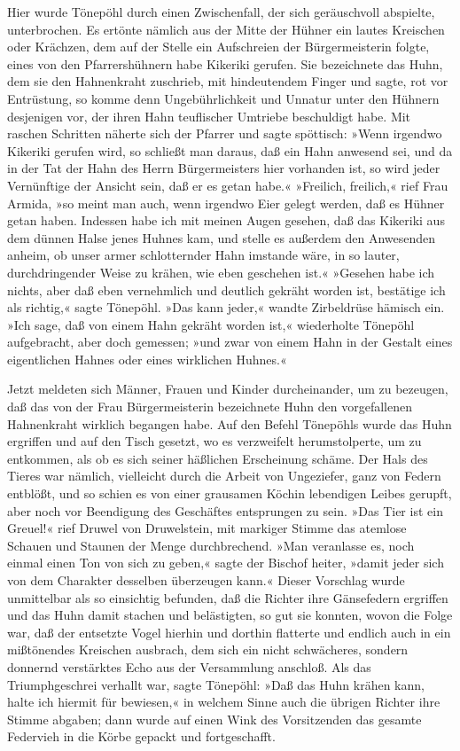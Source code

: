 Hier wurde Tönepöhl durch einen Zwischenfall, der sich geräuschvoll
abspielte, unterbrochen. Es ertönte nämlich aus der Mitte der
Hühner ein lautes Kreischen oder Krächzen, dem auf der Stelle ein
Aufschreien der Bürgermeisterin folgte, eines von den
Pfarrershühnern habe Kikeriki gerufen. Sie bezeichnete das Huhn,
dem sie den Hahnenkraht zuschrieb, mit hindeutendem Finger und
sagte, rot vor Entrüstung, so komme denn Ungebührlichkeit und
Unnatur unter den Hühnern desjenigen vor, der ihren Hahn
teuflischer Umtriebe beschuldigt habe. Mit raschen Schritten
näherte sich der Pfarrer und sagte spöttisch: »Wenn irgendwo
Kikeriki gerufen wird, so schließt man daraus, daß ein Hahn
anwesend sei, und da in der Tat der Hahn des Herrn Bürgermeisters
hier vorhanden ist, so wird jeder Vernünftige der Ansicht sein, daß
\pagenum{[49]}er es getan habe.« »Freilich, freilich,« rief Frau
Armida, »so meint man auch, wenn irgendwo Eier gelegt werden, daß
es Hühner getan haben. Indessen habe ich mit meinen Augen gesehen,
daß das Kikeriki aus dem dünnen Halse jenes Huhnes kam, und stelle
es außerdem den Anwesenden anheim, ob unser armer schlotternder
Hahn imstande wäre, in so lauter, durchdringender Weise zu krähen,
wie eben geschehen ist.« »Gesehen habe ich nichts, aber daß eben
vernehmlich und deutlich gekräht worden ist, bestätige ich als
richtig,« sagte Tönepöhl. »Das kann jeder,« wandte Zirbeldrüse
hämisch ein. »Ich sage, daß von einem Hahn gekräht worden ist,«
wiederholte Tönepöhl aufgebracht, aber doch gemessen; »und zwar von
einem Hahn in der Gestalt eines eigentlichen Hahnes oder eines
wirklichen Huhnes.«

Jetzt meldeten sich Männer, Frauen und Kinder durcheinander, um zu
bezeugen, daß das von der Frau Bürgermeisterin bezeichnete Huhn den
vorgefallenen Hahnenkraht wirklich begangen habe. Auf den Befehl
Tönepöhls wurde das Huhn ergriffen und auf den Tisch gesetzt, wo es
verzweifelt herumstolperte, um zu entkommen, als ob es sich seiner
häßlichen Erscheinung schäme. Der Hals des Tieres war nämlich,
vielleicht durch die Arbeit von Ungeziefer, ganz von Federn
entblößt, und so schien es von einer grausamen Köchin lebendigen
Leibes gerupft, aber noch vor Beendigung des Geschäftes entsprungen
zu sein. »Das Tier ist ein Greuel!« rief Druwel von Druwelstein,
mit markiger Stimme das atemlose Schauen und Staunen der Menge
durchbrechend. »Man veranlasse es, noch einmal einen Ton von sich
zu geben,« sagte der Bischof heiter, »damit jeder sich von dem
Charakter desselben überzeugen kann.« Dieser Vorschlag wurde
unmittelbar als so einsichtig befunden, daß die Richter
\pagenum{[50]}ihre Gänsefedern ergriffen und das Huhn damit
stachen und belästigten, so gut sie konnten, wovon die Folge war,
daß der entsetzte Vogel hierhin und dorthin flatterte und endlich
auch in ein mißtönendes Kreischen ausbrach, dem sich ein nicht
schwächeres, sondern donnernd verstärktes Echo aus der Versammlung
anschloß. Als das Triumphgeschrei verhallt war, sagte Tönepöhl:
»Daß das Huhn krähen kann, halte ich hiermit für bewiesen,« in
welchem Sinne auch die übrigen Richter ihre Stimme abgaben; dann
wurde auf einen Wink des Vorsitzenden das gesamte Federvieh in die
Körbe gepackt und fortgeschafft.

